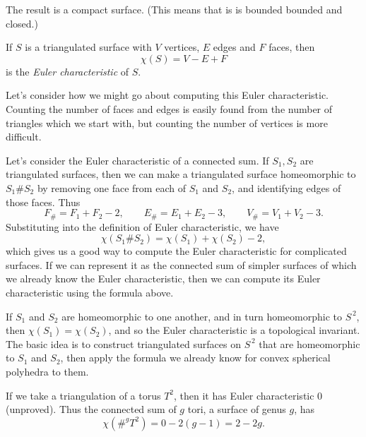 \begin{definition}
\begin{minipage}{0.24\textwidth}
	\end{minipage}

	The result is a compact surface. (This means that is is bounded bounded and closed.)

	If $S$ is a triangulated surface with $V$ vertices, $E$ edges and $F$ faces, then
	\begin{equation*}
		\chi(S) = V-E+F
	\end{equation*}
	is the \emph{Euler characteristic} of $S$.
\end{definition}

Let's consider how we might go about computing this Euler characteristic. Counting the number of faces and edges is easily found from the number of triangles which we start with, but counting the number of vertices is more difficult.

Let's consider the Euler characteristic of a connected sum. If $S_1,S_2$ are triangulated surfaces, then we can make a triangulated surface homeomorphic to $S_1 \# S_2$ by removing one face from each of $S_1$ and $S_2$, and identifying edges of those faces. Thus
\begin{equation*}
	F_\# = F_1 + F_2 - 2, \qquad E_\# = E_1 + E_2 - 3, \qquad V_\# = V_1 + V_2 - 3.
\end{equation*}
Substituting into the definition of Euler characteristic, we have
\begin{equation*}
	\chi(S_1 \# S_2) = \chi(S_1) + \chi(S_2) - 2,
\end{equation*}
which gives us a good way to compute the Euler characteristic for complicated surfaces. If we can represent it as the connected sum of simpler surfaces of which we already know the Euler characteristic, then we can compute its Euler characteristic using the formula above.

If $S_1$ and $S_2$ are homeomorphic to one another, and in turn homeomorphic to $S^{\,2}$, then $\chi(S_1) = \chi(S_2)$, and so the Euler characteristic is a topological invariant. The basic idea is to construct triangulated surfaces on $S^{\,2}$ that are homeomorphic to $S_1$ and $S_2$, then apply the formula we already know for convex spherical polyhedra to them.

\begin{example}
	If we take a triangulation of a torus $T^2$, then it has Euler characteristic $0$ (unproved). Thus the connected sum of $g$ tori, a surface of genus $g$, has
	\begin{equation*}
		\chi(\#^g T^2) = 0 - 2\left( g-1 \right) = 2-2g.
	\end{equation*}
\end{example}

